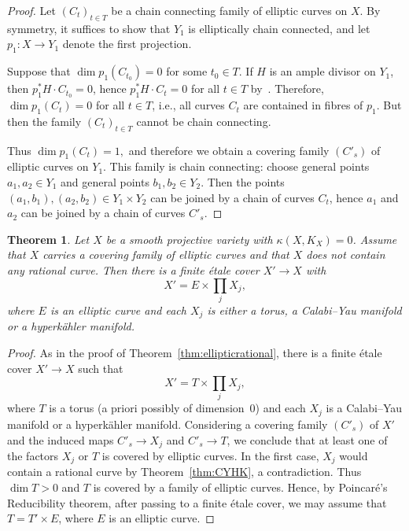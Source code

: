 \documentclass[11pt]{article}
\newtheorem{theo}{Theorem}[section]
\theoremstyle{definition}
\numberwithin{equation}{section}
\numberwithin{figure}{section}
\numberwithin{table}{section}
\begin{document}
\begin{proof}
Let $(C_t)_{t\in T}$ be a chain connecting family of elliptic curves on $X$. By symmetry, it suffices to show that $Y_1$ is elliptically chain connected, and let $p_1\colon X \to Y_1$ denote the first projection.

Suppose that $\dim p_1(C_{t_0}) = 0$ for some $t_0\in T$. If $H$ is an ample divisor on $Y_1$, then $p_1^*H\cdot C_{t_0}=0$, hence $p_1^*H\cdot C_t=0$ for all $t\in T$ by~\cite[Proposition~I.3.12]{Kol96}. Therefore, $\dim p_1(C_t) = 0$ for all $t\in T$, i.e., all curves $C_t$ are contained in fibres of $p_1$. But then the family $(C_t)_{t\in T}$ cannot be chain connecting.

Thus $\dim p_1(C_t) = 1,$ and therefore we obtain a covering family $(C'_s)$ of elliptic curves on $Y_1$. This family is chain connecting: choose general points $a_1, a_2 \in Y_1$ and general points $b_1,b_2 \in Y_2$. Then the points $(a_1,b_1),(a_2,b_2)\in Y_1\times Y_2$ can be joined by a chain of curves $C_t$, hence $a_1$ and $a_2$ can be joined by a chain of curves $C'_s$.
\end{proof}
\goodbreak
\begin{theo}\label{thm:kappa0}
Let $X$ be a smooth projective variety with $\kappa (X,K_X) = 0$. Assume that $X$ carries a covering family of elliptic curves and that $X$ does not contain any rational curve. Then there is a finite étale cover $X' \to X$ with
\[
X'=E \times \prod_j X_j,
\]
where $E$ is an elliptic curve and each $X_j$ is either a torus, a Calabi--Yau manifold or a hyperkähler manifold.
\end{theo}

\begin{proof}
As in the proof of Theorem~\ref{thm:ellipticrational}, there is a finite étale cover $X'\to X$ such that
\[
X'= T \times \prod_j X_j,
\]
where $T$ is a torus (a priori possibly of dimension~$0$) and each $X_j$ is a Calabi--Yau manifold or a hyperkähler manifold. Considering a covering family $(C'_s)$ of $X'$ and the induced maps $C'_s \to X_j$ and $C'_s \to T$, we conclude that at least one of the factors $X_j$ or $T$ is covered by elliptic curves. In the first case, $X_j$ would contain a rational curve by Theorem~\ref{thm:CYHK}, a contradiction. Thus $\dim T > 0 $ and $T$ is covered by a family of elliptic curves. Hence, by Poincaré's Reducibility theorem, after passing to a finite étale cover, we may assume that $T = T' \times E$, where $E$ is an elliptic curve.
\end{proof}\qedhere
\end{document}
